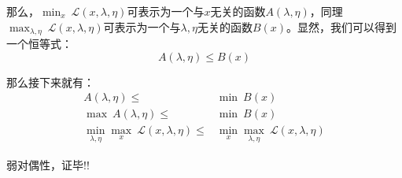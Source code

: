 \documentclass[a4paper]{article}
\begin{document}
那么，$\min_{x}\ \mathcal{L}(x,\lambda,\eta)$可表示为一个与$x$无关的函数$A(\lambda,\eta)$，同理$\max_{\lambda,\eta}\ \mathcal{L}(x,\lambda,\eta)$可表示为一个与$\lambda,\eta$无关的函数$B(x)$。显然，我们可以得到一个恒等式：
\begin{equation}
    A(\lambda,\eta) \leq B(x)
\end{equation}

那么接下来就有：
\begin{equation}
    \begin{split}
        A(\lambda,\eta) \leq & \min \ B(x) \\
        \max \ A(\lambda,\eta) \leq & \min \ B(x) \\
         \min_{\lambda,\eta}\max_{x}\  \mathcal{L}(x,\lambda,\eta) \leq & \min_{x}\max_{\lambda,\eta}\  \mathcal{L}(x,\lambda,\eta) 
    \end{split}
\end{equation}

弱对偶性，证毕!!
\end{document}

